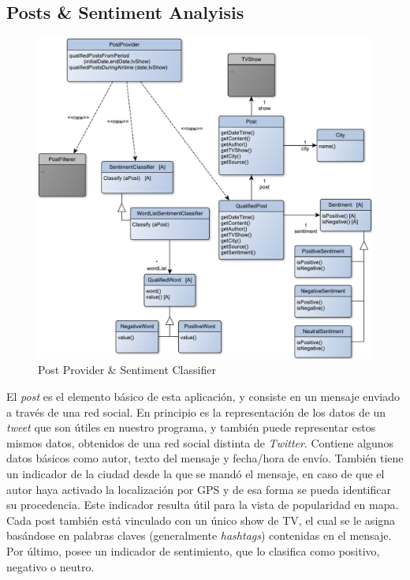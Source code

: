 \subsection{Posts \& Sentiment Analyisis}

\begin{figure}[H]
\centering
\includegraphics[width=\textwidth]{graph/clase/classifier.pdf}
\caption{Post Provider \& Sentiment Classifier}
\end{figure}

El \emph{post} es el elemento básico de esta aplicación, y consiste en un mensaje enviado a través de una red social. En principio es la representación de los datos de un \emph{tweet} que son útiles en nuestro programa, y también puede representar estos mismos datos, obtenidos de una red social distinta de \emph{Twitter}. Contiene algunos datos básicos como autor, texto del mensaje y fecha/hora de envío. También tiene un indicador de la ciudad desde la que se mandó el mensaje, en caso de que el autor haya activado la localización por GPS y de esa forma se pueda identificar su procedencia. Este indicador resulta útil para la vista de popularidad en mapa. Cada post también está vinculado con un único show de TV, el cual se le asigna basándose en palabras claves (generalmente \emph{hashtags}) contenidas en el mensaje. Por último, posee un indicador de sentimiento, que lo clasifica como positivo, negativo o neutro.
\bigskip

